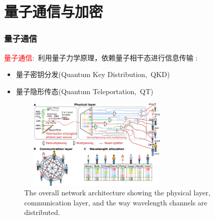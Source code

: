 \section{量子通信与加密}
\begin{frame}
    \frametitle{量子通信}
    \textcolor{red}{量子通信}:~利用量子力学原理，依赖量子相干态进行信息传输
    {\fontsize{7.5pt}{5.2pt}\selectfont{主要方式包括}}:
    \begin{itemize}
	\item 量子密钥分发\textrm{(Quantum Key Distribution,~QKD)}
	\item 量子隐形传态\textrm{(Quantum Teleportation,~QT)}
    \end{itemize}
    \begin{figure}
        \centering
                \includegraphics[height=1.7in, width=3.0in, viewport=0 0 1050 688,clip]{Figures/Quantum_Communication.jpeg}
		\caption{\tiny{\textrm{The overall network architecture showing the physical layer, communication layer, and the way wavelength channels are distributed.}}}%
		\label{Fig:Quantum_Communication}
    \end{figure}
\end{frame}


